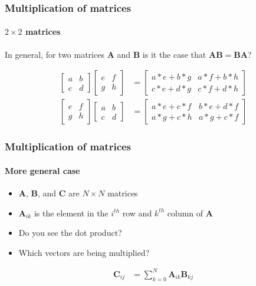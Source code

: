 \documentclass[xcolor=dvipsnames]{beamer}
\begin{document}
\begin{frame}
\frametitle{Multiplication of matrices}
\framesubtitle{$2 \times 2$ matrices}

  In general, for two matrices $\mathbf{A}$ and $\mathbf{B}$
  is it the case that $\mathbf{AB} = \mathbf{BA}$?

  \begin{align*}
    \left[ \begin{array}{rr}
      a & b \\
      c & d
      \end{array} \right]
    \left[ \begin{array}{rr}
      e & f \\
      g & h
      \end{array} \right]
    & = 
    \left[ \begin{array}{rr}
      a*e + b*g & a*f + b*h \\
      c*e + d*g & c*f + d*h
      \end{array} \right] \\
    \left[ \begin{array}{rr}
      e & f \\
      g & h
      \end{array} \right]
    \left[ \begin{array}{rr}
      a & b \\
      c & d
      \end{array} \right]
    & = 
    \left[ \begin{array}{rr}
      a*e + c*f & b*e + d*f \\
      a*g + c*h & a*g + c*f
      \end{array} \right]
    \end{align*}

  \end{frame}

\begin{frame}
\frametitle{Multiplication of matrices}
\framesubtitle{More general case}

  \begin{itemize}
    \item $\mathbf{A}$, $\mathbf{B}$, and $\mathbf{C}$
      are $N \times N$ matrices
    \item $\mathbf{A}_{ik}$ is the element in the $i^{th}$ row
      and $k^{th}$ column of $\mathbf{A}$
    \item Do you see the dot product?
    \item Which vectors are being multiplied?
    \end{itemize}

  \begin{align*}
    \mathbf{C}_{ij} & = \sum_{k = 0}^N \mathbf{A}_{ik} \mathbf{B}_{kj}
    \end{align*}

  \end{frame}
\end{document}
